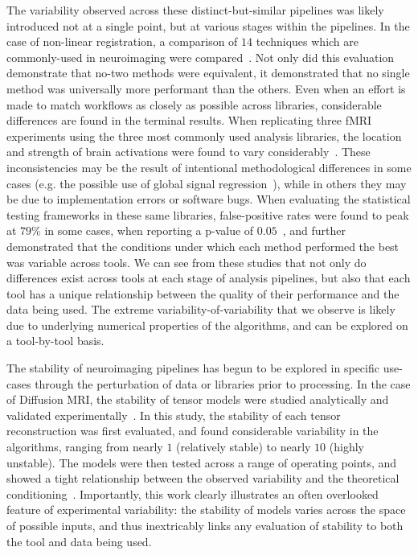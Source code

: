The variability observed across these distinct-but-similar pipelines was likely introduced not at a single point, but
at various stages within the pipelines. In the case of non-linear registration, a comparison of $14$ techniques which
are commonly-used in neuroimaging were compared~\cite{klein2009evaluation}. Not only did this evaluation demonstrate
that no-two methods were equivalent, it demonstrated that no single method was universally more performant than the
others. Even when an effort is made to match workflows as closely as possible across libraries, considerable
differences are found in the terminal results. When replicating three fMRI experiments using the three most commonly
used analysis libraries, the location and strength of brain activations were found to vary
considerably~\cite{bowring2019exploring}. These inconsistencies may be the result of intentional methodological
differences in some cases (e.g. the possible use of global signal regression~\cite{murphy2017towards}), while in others
they may be due to implementation errors or software bugs. When evaluating the statistical testing frameworks in these
same libraries, false-positive rates were found to peak at $79\%$ in some cases, when reporting a p-value of
$0.05$~\cite{eklund2016cluster}, and further demonstrated that the conditions under which each method performed the
best was variable across tools. We can see from these studies that not only do differences exist across tools at each
stage of analysis pipelines, but also that each tool has a unique relationship between the quality of their performance
and the data being used. The extreme variability-of-variability that we observe is likely due to underlying numerical
properties of the algorithms, and can be explored on a tool-by-tool basis.

The stability of neuroimaging pipelines has begun to be explored in specific use-cases through the perturbation of data
or libraries prior to processing. In the case of Diffusion MRI, the stability of tensor models were studied
analytically and validated experimentally~\cite{skare2000condition}. In this study, the stability of each tensor
reconstruction was first evaluated, and found considerable variability in the algorithms, ranging from nearly $1$
(relatively stable) to nearly $10$ (highly unstable). The models were then tested across a range of operating points,
and showed a tight relationship between the observed variability and the theoretical
conditioning~\cite{skare2000condition}. Importantly, this work clearly illustrates an often overlooked feature of
experimental variability: the stability of models varies across the space of possible inputs, and thus inextricably
links any evaluation of stability to both the tool and data being used.

